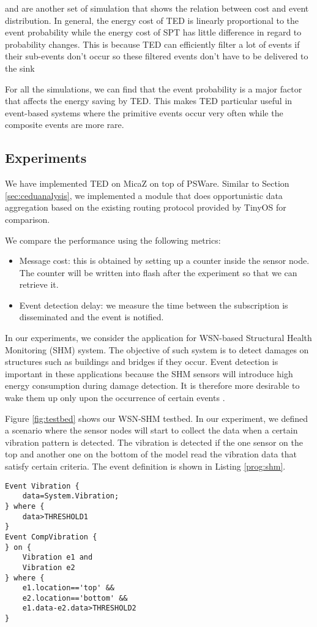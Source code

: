 and are another set of simulation that shows the relation between cost and event distribution. In general, the energy cost of TED is linearly proportional to the event probability while the energy cost of SPT has little difference in regard to probability changes. This is because TED can efficiently filter a lot of events if their sub-events don't occur so these filtered events don't have to be delivered to the sink

For all the simulations, we can find that the event probability is a major factor that affects the energy saving by TED. This makes TED particular useful in event-based systems where the primitive events occur very often while the composite events are more rare.

\subsection{Experiments}
\label{sec:experiments}
We have implemented TED on MicaZ on top of PSWare. Similar to Section \ref{sec:ceduanalysis}, we implemented a module that does opportunistic data aggregation based on the existing routing protocol provided by TinyOS for comparison.

We compare the performance using the following metrics:
\begin{itemize}
\item Message cost: this is obtained by setting up a counter inside the sensor node. The counter will be written into flash after the experiment so that we can retrieve it.
\item Event detection delay: we measure the time between the subscription is disseminated and the event is notified.
\end{itemize}

In our experiments, we consider the application for WSN-based Structural Health Monitoring (SHM) system. The objective of such system is to detect damages on structures such as buildings and bridges if they occur. Event detection is important in these applications because the SHM sensors will introduce high energy consumption during damage detection. It is therefore more desirable to wake them up only upon the occurrence of certain events \cite{jangshm}.

Figure \ref{fig:testbed} shows our WSN-SHM testbed. In our experiment, we defined a scenario where the sensor nodes will start to collect the data when a certain vibration pattern is detected. The vibration is detected if the one sensor on the top and another one on the bottom of the model read the vibration data that satisfy certain criteria. The event definition is shown in Listing \ref{prog:shm}.
\begin{lstlisting}[caption=Event definition for SHM, label=prog:shm]
Event Vibration {
	data=System.Vibration;
} where {
	data>THRESHOLD1
}
Event CompVibration {
} on {
	Vibration e1 and
	Vibration e2
} where {
	e1.location=='top' &&
	e2.location=='bottom' &&
	e1.data-e2.data>THRESHOLD2
}
\end{lstlisting}

